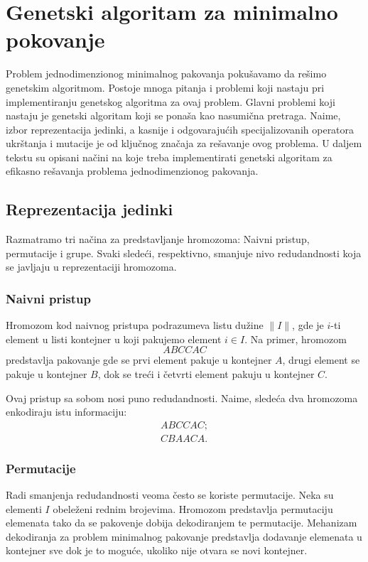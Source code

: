 \documentclass[a4paper,12pt,twocolumn]{article}
\begin{document}
\section{Genetski algoritam za minimalno pokovanje}

Problem jednodimenzionog minimalnog pakovanja pokušavamo da rešimo genetskim
algoritmom. Postoje mnoga pitanja i problemi koji nastaju pri implementiranju 
genetskog algoritma za ovaj problem. Glavni problemi koji nastaju je genetski
algoritam koji se ponaša kao nasumična pretraga\cite{f96}. Naime, izbor 
reprezentacija jedinki, a kasnije i odgovarajućih specijalizovanih operatora
ukrštanja i mutacije je od ključnog značaja za rešavanje ovog problema. 
U daljem tekstu su opisani načini na koje treba implementirati genetski 
algoritam za efikasno rešavanja problema jednodimenzionog pakovanja.

\subsection{Reprezentacija jedinki}

Razmatramo tri načina za predstavljanje hromozoma: Naivni pristup, 
permutacije i grupe. Svaki sledeći, respektivno, smanjuje nivo redudandnosti
koja se javljaju u reprezentaciji hromozoma.

\subsubsection{Naivni pristup}

Hromozom kod naivnog pristupa podrazumeva listu dužine $\|I\|$, gde je $i$-ti
element u listi kontejner u koji pakujemo element $i \in I$. Na primer, 
hromozom
\[ABCCAC\]
predstavlja pakovanje gde se prvi element pakuje u kontejner $A$, drugi 
element se pakuje u kontejner $B$, dok se treći i četvrti element pakuju u 
kontejner $C$.

Ovaj pristup sa sobom nosi puno redudandnosti. Naime, sledeća dva hromozoma
enkodiraju istu informaciju:
\[
    \begin{aligned}
        ABCCAC; \\
        CBAACA.
    \end{aligned}
\]

\subsubsection{Permutacije}

Radi smanjenja redudandnosti veoma često se koriste permutacije. Neka
su elementi $I$ obeleženi rednim brojevima. Hromozom predstavlja permutaciju
elemenata tako da se pakovenje dobija dekodiranjem te permutacije. 
Mehanizam dekodiranja za problem minimalnog pakovanje predstavlja dodavanje
elemenata u kontejner sve dok je to moguće, ukoliko nije otvara se novi 
kontejner.
\end{document}
